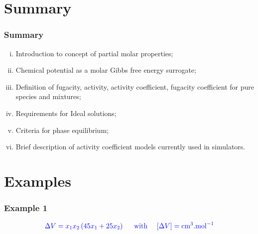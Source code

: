 \documentclass[10pt,compress,handout,ignorenonframetext,unknownkeysallowed]{beamer}
\begin{document}
\section{Summary}

\begin{frame}
 \frametitle{Summary}
   \begin{enumerate}[(i)]
      \item Introduction to concept of partial molar properties;
      \item Chemical potential as a molar Gibbs free energy surrogate;
      \item Definition of fugacity, activity, activity coefficient, fugacity coefficient for pure species and mixtures;
      \item Requirements for Ideal solutions;
      \item Criteria for phase equilibrium;
      \item Brief description of activity coefficient models currently used in simulators.
   \end{enumerate}
\end{frame}



\section{Examples}

\begin{frame}
 \frametitle{Example 1}\label{Ex1}
       \begin{displaymath}
          \textcolor{blue}{\Delta V = x_{1}x_{2}\left(45x_{1}+25x_{2}\right)\;\;\;\;\text{ with }\;\;\;\left[\Delta V\right] = \text{cm}^{3}.\text{mol}^{-1}}
       \end{displaymath}

\end{frame}
\end{document}
